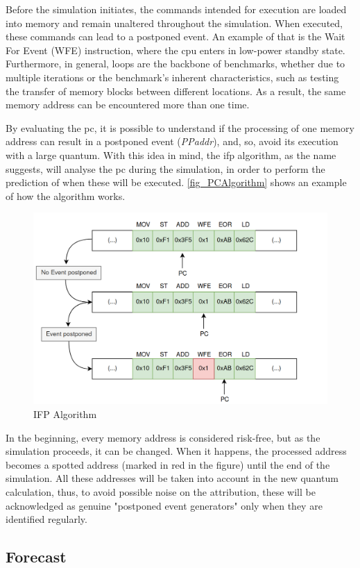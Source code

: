 Before the simulation initiates, the commands intended for execution are loaded into memory and remain unaltered throughout the simulation.  
When executed, these commands can lead to a postponed event. 
An example of that is the Wait For Event (WFE) instruction, where the \gls{cpu} enters in low-power 
standby state. Furthermore, in general, loops are the backbone of benchmarks, whether due to multiple iterations or the benchmark's inherent 
characteristics, such as testing the transfer of memory blocks between different locations. As a result, the same memory address can be 
encountered more than one time. 

By evaluating the \gls{pc}, it is possible to understand if the processing of one memory address can result in a postponed event (\textit{PPaddr}), 
and, so, avoid its execution with a large quantum. With this idea in mind, the \gls{ifp} algorithm, as the name suggests, will analyse the \gls{pc} during 
the simulation, in order to perform the prediction of when these will be executed. \autoref{fig_PCAlgorithm} shows an example 
of how the algorithm works.

\begin{figure}[h!]
	\centering
 	\includegraphics[width=0.7\linewidth]{Images/PCAlgorithm.png}
 	\caption{IFP Algorithm}
	 \label{fig_PCAlgorithm}
\end{figure}

In the beginning, every memory address is considered risk-free, but as the simulation proceeds, it can be changed. When it happens, the processed 
address becomes a spotted address (marked in red in the figure) until the end of the simulation. All these addresses will be taken into 
account in the new quantum calculation, thus, to avoid possible noise on the attribution, these will be acknowledged as genuine 
"postponed event generators" only when they are identified regularly.

 
\subsection{Forecast}

